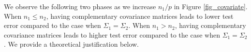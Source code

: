We observe the following two phases as we increase $n_1 / p$ in Figure \ref{fig_covariate}.
When $n_1 \le n_2$, having complementary covariance matrices leads to lower test error compared to the case when $\Sigma_1 = \Sigma_2$.
When $n_1 > n_2$, having complementary covariance matrices leads to higher test error compared to the case when $\Sigma_1 = \Sigma_2$.
We provide a theoretical justification below.

